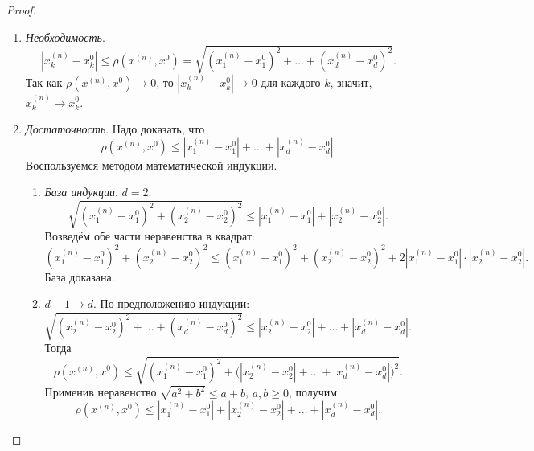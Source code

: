 \documentclass[12pt,a4paper]{report}
\begin{document}
\begin{proof}
    \begin{enumerate}
        \item[$\Longrightarrow$] \textit{Необходимость}. 
        \[
        |x_k^{(n)}-x_k^0|\leq \rho(x^{(n)},x^0)=\sqrt{(x_1^{(n)}-x_1^0)^2+\dots+(x_d^{(n)}-x_d^0)^2}.
        \]
        Так как $\rho(x^{(n)},x^0)\to 0$, то $|x_k^{(n)}-x_k^0|\to 0$ для каждого $k$, значит, $x_k^{(n)}\to x_k^0$.

        \item[$\Longleftarrow$] \textit{Достаточность}. Надо доказать, что
        \[
        \rho(x^{(n)},x^0)\leq |x_1^{(n)}-x_1^0|+\dots +|x_d^{(n)}-x_d^0|.
        \]
        Воспользуемся методом математической индукции.
        \begin{enumerate}
            \item \textit{База индукции}. $d=2$.
            \[
            \sqrt{(x_1^{(n)}-x_1^0)^2+(x_2^{(n)}-x_2^0)^2} \leq |x_1^{(n)}-x_1^0|+|x_2^{(n)}-x_2^0|.
            \]
            Возведём обе части неравенства в квадрат:
            \[
            (x_1^{(n)}-x_1^0)^2+(x_2^{(n)}-x_2^0)^2
            \leq (x_1^{(n)}-x_1^0)^2+(x_2^{(n)}-x_2^0)^2+2|x_1^{(n)}-x_1^0|\cdot|x_2^{(n)}-x_2^0|.
            \]
            База доказана.

            \item $d-1\to d$. По предположению индукции:
            \[
            \sqrt{(x_2^{(n)}-x_2^0)^2+\dots+(x_d^{(n)}-x_d^0)^2}
            \leq |x_2^{(n)}-x_2^0|+\dots+|x_d^{(n)}-x_d^0|.
            \]
            Тогда
            \[
            \rho(x^{(n)},x^0)\leq \sqrt{(x_1^{(n)}-x_1^0)^2+\bigl(|x_2^{(n)}-x_2^0|+\dots + |x_d^{(n)}-x_d^0|\bigr)^2}.
            \]
            Применив неравенство $\sqrt{a^2+b^2}\le a+b$, $a,b\ge0$, получим
            \[
            \rho(x^{(n)},x^0)\le |x_1^{(n)}-x_1^0|+|x_2^{(n)}-x_2^0|+\dots+|x_d^{(n)}-x_d^0|.
            \]
        \end{enumerate}
    \end{enumerate}
\end{proof}


\end{document}
